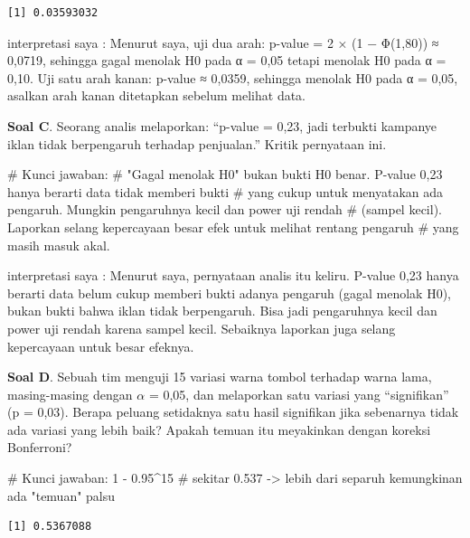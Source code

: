 \documentclass[
  indonesian,
  letterpaper,
]{book}
\newenvironment{Shaded}{\begin{snugshade}}{\end{snugshade}}
\newcommand{\CommentTok}[1]{\textcolor[rgb]{0.37,0.37,0.37}{#1}}
\newcommand{\DecValTok}[1]{\textcolor[rgb]{0.68,0.00,0.00}{#1}}
\newcommand{\FloatTok}[1]{\textcolor[rgb]{0.68,0.00,0.00}{#1}}
\newcommand{\SpecialCharTok}[1]{\textcolor[rgb]{0.37,0.37,0.37}{#1}}
\begin{document}
\begin{verbatim}
[1] 0.03593032
\end{verbatim}

interpretasi saya : Menurut saya, uji dua arah: p-value = 2 × (1 −
Φ(1,80)) ≈ 0,0719, sehingga gagal menolak H0 pada α = 0,05 tetapi
menolak H0 pada α = 0,10. Uji satu arah kanan: p-value ≈ 0,0359,
sehingga menolak H0 pada α = 0,05, asalkan arah kanan ditetapkan sebelum
melihat data.

\textbf{Soal C}. Seorang analis melaporkan: ``p-value = 0,23, jadi
terbukti kampanye iklan tidak berpengaruh terhadap penjualan.'' Kritik
pernyataan ini.

\begin{Shaded}
\begin{Highlighting}[]
\CommentTok{\# Kunci jawaban:}
\CommentTok{\# "Gagal menolak H0" bukan bukti H0 benar. P{-}value 0,23 hanya berarti data tidak memberi bukti}
\CommentTok{\# yang cukup untuk menyatakan ada pengaruh. Mungkin pengaruhnya kecil dan power uji rendah}
\CommentTok{\# (sampel kecil). Laporkan selang kepercayaan besar efek untuk melihat rentang pengaruh}
\CommentTok{\# yang masih masuk akal.}
\end{Highlighting}
\end{Shaded}

interpretasi saya : Menurut saya, pernyataan analis itu keliru. P-value
0,23 hanya berarti data belum cukup memberi bukti adanya pengaruh (gagal
menolak H0), bukan bukti bahwa iklan tidak berpengaruh. Bisa jadi
pengaruhnya kecil dan power uji rendah karena sampel kecil. Sebaiknya
laporkan juga selang kepercayaan untuk besar efeknya.

\textbf{Soal D}. Sebuah tim menguji 15 variasi warna tombol terhadap
warna lama, masing-masing dengan \(\alpha\) = 0,05, dan melaporkan satu
variasi yang ``signifikan'' (p = 0,03). Berapa peluang setidaknya satu
hasil signifikan jika sebenarnya tidak ada variasi yang lebih baik?
Apakah temuan itu meyakinkan dengan koreksi Bonferroni?

\begin{Shaded}
\begin{Highlighting}[]
\CommentTok{\# Kunci jawaban:}
\DecValTok{1} \SpecialCharTok{{-}} \FloatTok{0.95}\SpecialCharTok{\^{}}\DecValTok{15}   \CommentTok{\# sekitar 0.537 {-}\textgreater{} lebih dari separuh kemungkinan ada "temuan" palsu}
\end{Highlighting}
\end{Shaded}

\begin{verbatim}
[1] 0.5367088
\end{verbatim}
\end{document}
